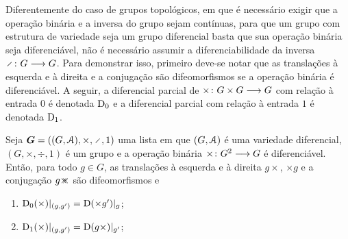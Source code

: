 Diferentemente do caso de grupos topológicos, em que é necessário exigir que a operação binária e a inversa do grupo sejam contínuas, para que um grupo com estrutura de variedade seja um grupo diferencial basta que sua operação binária seja diferenciável, não é necessário assumir a diferenciabilidade da inversa $\fun{\div}{G}{G}$. Para demonstrar isso, primeiro deve-se notar que as translações à esquerda e à direita e a conjugação são difeomorfismos se a operação binária é diferenciável. A seguir, a diferencial parcial de ${\times}\colon {G \times G} \longrightarrow {G}$ com relação à entrada $0$ é denotada $\mathrm{D}_0$ e a diferencial parcial com relação à entrada $1$ é denotada $\mathrm{D}_1$.

\begin{exercise}
Seja $\bm G = ((G,\atlas),\times,\div,1)$ uma lista em que $(G,\mathcal{A})$ é uma variedade diferencial, $(G,\times,\div,1)$ é um grupo e a operação binária ${\times}\colon {G^2} \longrightarrow {G}$ é diferenciável. Então, para todo $g \in G$, as translações à esquerda e à direita $g\times$, $\times g$ e a conjugação $g\con$ são difeomorfismos e
	\begin{enumerate}
	\item $\mathrm{D}_0(\times)|_{(g,g')} = \mathrm{D} (\times g')|_{g}$;
	\item $\mathrm{D}_1(\times)|_{(g,g')} = \mathrm{D} (g \times)|_{g'}$;
	\end{enumerate}
\end{exercise}


